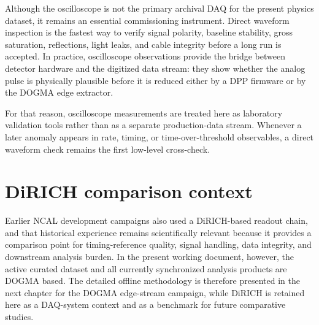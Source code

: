 Although the oscilloscope is not the primary archival DAQ for the present physics dataset, it remains an essential commissioning instrument. Direct waveform inspection is the fastest way to verify signal polarity, baseline stability, gross saturation, reflections, light leaks, and cable integrity before a long run is accepted. In practice, oscilloscope observations provide the bridge between detector hardware and the digitized data stream: they show whether the analog pulse is physically plausible before it is reduced either by a DPP firmware or by the DOGMA edge extractor.

For that reason, oscilloscope measurements are treated here as laboratory validation tools rather than as a separate production-data stream. Whenever a later anomaly appears in rate, timing, or time-over-threshold observables, a direct waveform check remains the first low-level cross-check.

\section{DiRICH comparison context}

Earlier NCAL development campaigns also used a DiRICH-based readout chain, and that historical experience remains scientifically relevant because it provides a comparison point for timing-reference quality, signal handling, data integrity, and downstream analysis burden. In the present working document, however, the active curated dataset and all currently synchronized analysis products are DOGMA based. The detailed offline methodology is therefore presented in the next chapter for the DOGMA edge-stream campaign, while DiRICH is retained here as a DAQ-system context and as a benchmark for future comparative studies.

